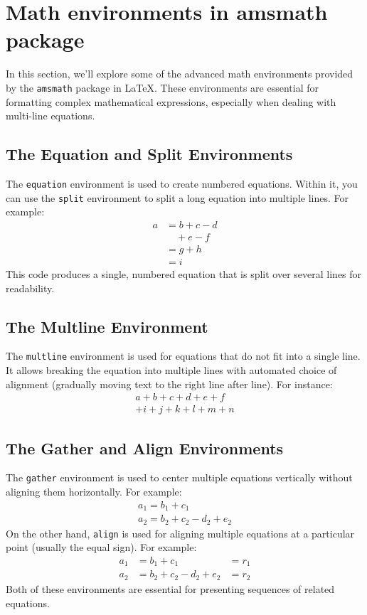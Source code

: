 \section{Math environments in amsmath package}
\par In this section, we'll explore some of the advanced math environments provided by the \verb"amsmath" package in LaTeX. These environments are essential for formatting complex mathematical expressions, especially when dealing with multi-line equations.

\subsection{The Equation and Split Environments}
\par The \verb"equation" environment is used to create numbered equations. Within it, you can use the \verb"split" environment to split a long equation into multiple lines. For example:
\begin{equation}\label{eq:one}
    \begin{split}
      a & = b+c-d\\
        & \quad +e-f\\
        & =g+h\\
        & =i
    \end{split}
\end{equation}
This code produces a single, numbered equation that is split over several lines for readability.

\subsection{The Multline Environment}
\par The \verb"multline" environment is used for equations that do not fit into a single line. It allows breaking the equation into multiple lines with automated choice of alignment (gradually moving text to the right line after line). For instance:
\begin{multline}
    a+b+c+d+e+f\\
    +i+j+k+l+m+n
\end{multline}


\subsection{The Gather and Align Environments}
\par The \verb"gather" environment is used to center multiple equations vertically without aligning them horizontally. For example:
\begin{gather}
    a_1=b_1+c_1\\
    a_2=b_2+c_2-d_2+e_2
\end{gather}
On the other hand, \verb"align" is used for aligning multiple equations at a particular point (usually the equal sign). For example:
\begin{align}
    a_1& =b_1+c_1 & = r_1\\
    a_2& =b_2+c_2-d_2+e_2 &= r_2
\end{align}
Both of these environments are essential for presenting sequences of related equations.

